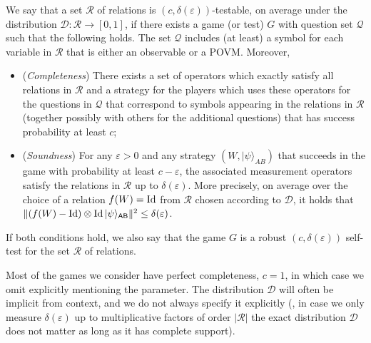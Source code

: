 \documentclass{toc}
\newcommand{\ket}[1]{|#1\rangle}
\newcommand{\Id}{\ensuremath{\mathop{\rm Id}\nolimits}}
\newcommand{\reg}[1]{{\textsf{#1}}}
\newcommand{\eps}{\varepsilon}
\begin{document}
\begin{definition}
We say that a
%
set $\mathcal{R}$ of relations %
is $(c,\delta(\eps))$-testable, on average under the distribution $\mathcal{D}:\mathcal{R}\to[0,1]$, if
  there exists a game (or test) $G$ with question set $\mathcal{Q}$ such that the following holds. The set $\mathcal{Q}$ includes (at least) a symbol for each variable in $\mathcal{R}$ that is either
  an observable or a POVM. Moreover,
\begin{itemize}
\item (\emph{Completeness}) There exists a set of operators which exactly satisfy all relations in $\mathcal{R}$ and a strategy for the players which uses these operators for the questions in $\mathcal{Q}$ that correspond to symbols appearing in the relations
in  %
$\mathcal{R}$ (together possibly with others for the additional questions) that has success probability at least $c$;
\item (\emph{Soundness}) For any $\eps>0$ and any strategy $(W,\ket{\psi}_{AB})$ that succeeds in the game with probability at least $c-\eps$, the associated measurement operators satisfy the relations in $\mathcal{R}$ up to $\delta(\eps)$. More precisely, on average
 over the choice of a relation $f(W)=\Id$ from $\mathcal{R}$ chosen according to $\mathcal{D}$, it holds that $\|  (f(W)-\Id)\otimes\Id \ket{\psi}_{\reg{AB}}\|^2 \leq \delta(\eps)$.
\end{itemize}
If both conditions hold, we also say that the game $G$ is a robust $(c,\delta(\eps))$ self-test for the %
set $\mathcal{R}$ of relations. %
\end{definition}

Most of the games we consider have perfect completeness, $c=1$, in which case we  omit explicitly mentioning the parameter. 
 The distribution $\mathcal{D}$ will often be implicit from context, and we do not always specify it explicitly (\eg, in case we only measure $\delta(\eps)$ up to multiplicative factors of order $|\mathcal{R}|$ the exact distribution $\mathcal{D}$ does not matter as long as it has complete support). 
\end{document}
